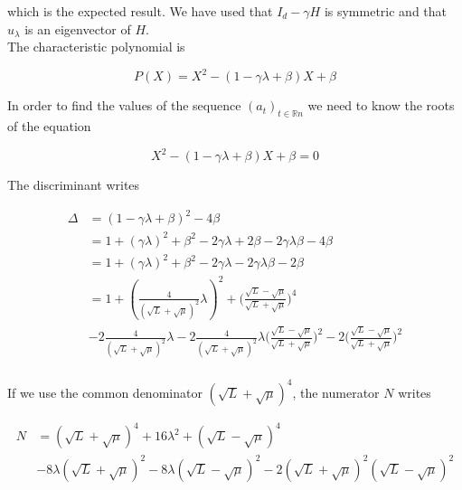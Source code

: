 \documentclass[
10pt, %
a4paper, %
oneside, %
headinclude,footinclude, %
BCOR5mm, %
]{scrartcl}
\begin{document}
which is the expected result. We have used that $ I_d- \gamma H$ is symmetric and that $ u_{\lambda}$ is an eigenvector of $H$.
\\

\exercice{}
The characteristic polynomial is

\begin{equation}
    P(X) = X^2-(1- \gamma\lambda +\beta)X+ \beta
\end{equation}

In order to find the values of the sequence $(a_t)_{t\in \mathbb{R} n}$ we need to know the roots of the equation

\begin{equation}
    \label{eq:cara}
    X^2-(1- \gamma\lambda +\beta)X+ \beta=0
\end{equation}

The discriminant writes

\begin{equation}
    \begin{aligned}
        \label{eq:}
	\Delta &= (1- \gamma\lambda +\beta)^2- 4\beta \\
	&= 1+ (\gamma\lambda)^2 +\beta^2-2 \gamma\lambda + 2 \beta - 2 \gamma\lambda \beta- 4\beta \\
	&= 1+ (\gamma\lambda)^2 +\beta^2-2 \gamma\lambda  - 2 \gamma\lambda \beta- 2\beta \\
	&= 1+ (\frac{4}{( \sqrt{L} + \sqrt{\mu} )^2}\lambda)^2 +\Big( \frac{\sqrt{L} - \sqrt{\mu}}{\sqrt{L} + \sqrt{\mu}}  \Big)^4\\
	&-2 \frac{4}{( \sqrt{L} + \sqrt{\mu} )^2}\lambda - 2 \frac{4}{( \sqrt{L} + \sqrt{\mu} )^2}\lambda \Big( \frac{\sqrt{L} - \sqrt{\mu}}{\sqrt{L} + \sqrt{\mu}}  \Big)^2- 2\Big( \frac{\sqrt{L} - \sqrt{\mu}}{\sqrt{L} + \sqrt{\mu}}  \Big)^2 \\
    \end{aligned}
\end{equation}

If we use the common denominator $( \sqrt{L} + \sqrt{\mu} )^4$, the numerator $N$ writes

\begin{equation}
    \begin{aligned}
        \label{eq:}
	N&= ( \sqrt{L} + \sqrt{\mu} )^4+16 \lambda^2+( \sqrt{L} - \sqrt{\mu} )^4\\
	&-8\lambda( \sqrt{L} + \sqrt{\mu} )^2-8\lambda ( \sqrt{L} - \sqrt{\mu} )^2-  2 ( \sqrt{L} + \sqrt{\mu} )^2( \sqrt{L} - \sqrt{\mu} )^2\\
    \end{aligned}
\end{equation}
\end{document}
